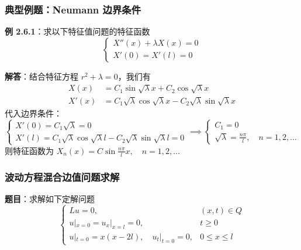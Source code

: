 \documentclass[12pt,a4paper]{ctexart}
\begin{document}
	\subsubsection{典型例题：Neumann 边界条件}
	\textbf{例 2.6.1}：求以下特征值问题的特征函数
	\begin{equation}
		\begin{cases}
			X''(x) + \lambda X(x) = 0 \\
			X'(0) = X'(l) = 0
		\end{cases}
	\end{equation}
	
	\textbf{解答}：结合特征方程 $r^2 + \lambda = 0$，我们有
	\begin{align*}
		X(x) &= C_1 \sin \sqrt{\lambda}x + C_2 \cos \sqrt{\lambda}x \\
		X'(x) &= C_1 \sqrt{\lambda} \cos \sqrt{\lambda}x - C_2 \sqrt{\lambda} \sin \sqrt{\lambda}x
	\end{align*}
	代入边界条件：
	\begin{equation}
		\begin{cases}
			X'(0) = C_1 \sqrt{\lambda} = 0 \\
			X'(l) = C_1 \sqrt{\lambda} \cos \sqrt{\lambda}l - C_2 \sqrt{\lambda} \sin \sqrt{\lambda}l = 0
		\end{cases}
		\implies
		\begin{cases}
			C_1 = 0 \\
			\sqrt{\lambda} = \frac{n\pi}{l}, \quad n=1, 2, \dots
		\end{cases}
	\end{equation}
	则特征函数为 $X_n(x) = C \sin \frac{n\pi}{l}x, \quad n=1, 2, \dots$ 
	
	\subsubsection{波动方程混合边值问题求解}
	\textbf{题目}：求解如下定解问题
	\begin{equation}
		\begin{cases}
			Lu = 0, & (x, t) \in Q \\
			u|_{x=0} = u_x|_{x=l} = 0, & t \ge 0 \\
			u|_{t=0} = x(x-2l), \quad u_t|_{t=0} = 0, & 0 \le x \le l
		\end{cases}
	\end{equation}
	
\end{document}
